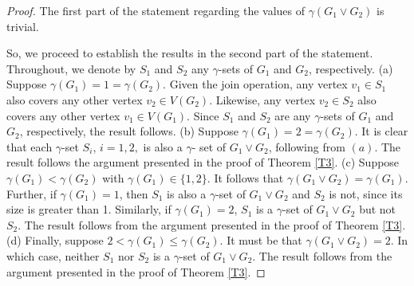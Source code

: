 \documentclass[twoside,12pt]{article}
\begin{document}

\begin{proof}
The first part of the statement regarding the values of $\gamma(G_1\vee G_2)$ is trivial.

So, we proceed to establish the results in the second part of the statement. Throughout, we denote by $S_1$ and $S_2$ any $\gamma$-sets of $G_1$ and $G_2$, respectively. %
\newline
(a)
\newline
Suppose $\gamma(G_1)=1=\gamma(G_2)$. Given the join operation, any vertex $v_1\in S_1$ also covers any other vertex $v_2\in V(G_2)$. Likewise, any vertex $v_2\in S_2$ also covers any other vertex $v_1\in V(G_1)$. Since $S_1$ and $S_2$ are any $\gamma$-sets of $G_1$ and $G_2$, respectively, the result follows.
\newline
(b)
\newline
Suppose $\gamma(G_1)=2=\gamma(G_2)$. 
It is clear that each $\gamma$-set $S_i$, $i=1,2,$ is also a $\gamma$- set of $G_1\vee G_2$, following from $(a)$. The result follows the argument presented in the proof of Theorem \ref{T3}.
\newline
(c)
\newline
Suppose $\gamma(G_1)<\gamma(G_2)$ with $\gamma(G_1) \in \{1,2\}$. It follows that $\gamma(G_1\vee G_2)=\gamma(G_1)$. Further, if $\gamma(G_1)=1$, then $S_1$ is also a $\gamma$-set of $G_1\vee G_2$ and $S_2$ is not, since its size is greater than 1. Similarly, if $\gamma(G_1)=2$, $S_1$ is a $\gamma$-set of $G_1\vee G_2$ but not $S_2$. The result follows from the argument presented in the proof of Theorem \ref{T3}.
\newline
(d)
\newline
Finally, suppose $2<\gamma(G_1)\le \gamma(G_2)$. %
It must be that $\gamma(G_1\vee G_2)=2$. In which case, neither $S_1$ nor $S_2$ is a $\gamma$-set of $G_1\vee G_2$. The result follows from the argument presented in the proof of Theorem \ref{T3}.


\end{proof}
\end{document}
